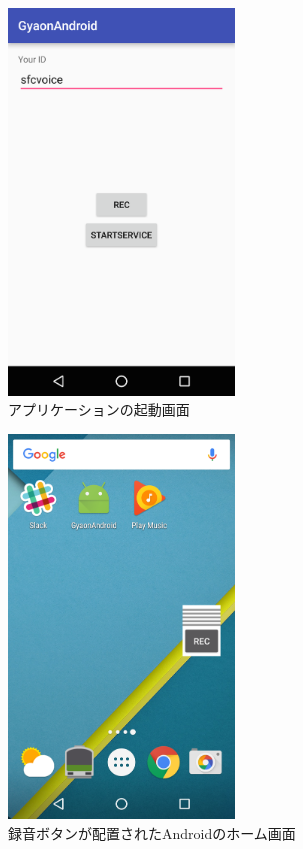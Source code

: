\begin{figure}[H]
\centering
\includegraphics[width=6cm]{images/app.png}
\caption{アプリケーションの起動画面}
\label{app}
\end{figure}

\begin{figure}[H]
\centering
\includegraphics[width=6cm]{images/home.png}
\caption{録音ボタンが配置されたAndroidのホーム画面}
\label{home}
\end{figure}
